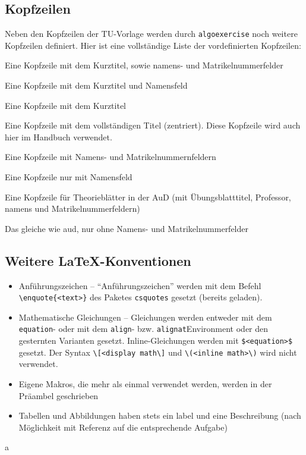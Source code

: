 \documentclass[
    titleprefix=AlgoTeX,
    inlineshortcut=java,
    corporatedesign,
    boxarc,
]{algoexercise}
\begin{document}
    \subsection{Kopfzeilen}
    Neben den Kopfzeilen der TU-Vorlage werden durch \verb+algoexercise+ noch weitere Kopfzeilen definiert.
    Hier ist eine vollständige Liste der vordefinierten Kopfzeilen:
    \begin{description}[leftmargin=3cm]
        \item[title-name-id] Eine
            Kopfzeile mit dem Kurztitel, sowie namens- und Matrikelnummerfelder
        \item[title-name] Eine Kopfzeile mit dem Kurztitel und
            Namensfeld
        \item[title] Eine Kopfzeile mit dem Kurztitel
        \item[fulltitle-centered] Eine Kopfzeile mit dem vollständigen Titel
            (zentriert).
            Diese Kopfzeile wird auch hier im Handbuch verwendet.
        \item[name-id] Eine Kopfzeile mit Namens- und Matrikelnummernfeldern
        \item[name] Eine Kopfzeile nur mit Namensfeld
        \item[aud] Eine Kopfzeile für Theorieblätter in der AuD (mit Übungsblatttitel, Professor, namens und
            Matrikelnummerfeldern)
        \item[aud-min] Das gleiche wie aud, nur ohne Namens- und Matrikelnummerfelder
    \end{description}
    \subsection{Weitere \LaTeX-Konventionen}
    \begin{itemize}
        \item Anführungszeichen -- \enquote{Anführungszeichen} werden mit dem Befehl \verb+\enquote{<text>}+ des Paketes
            \verb+csquotes+
            gesetzt (bereits geladen).
        \item Mathematische Gleichungen -- Gleichungen werden entweder mit dem \verb+equation+- oder mit dem \verb+align+- bzw.
            \verb+alignat+Environment oder den gesternten Varianten gesetzt.
            Inline-Gleichungen werden mit \verb+$<equation>$+ gesetzt.
            Der Syntax \verb+\[<display math\]+ und \verb+\(<inline math>\)+ wird nicht verwendet.
        \item Eigene Makros, die mehr als einmal verwendet werden, werden in der Präambel geschrieben
        \item Tabellen und Abbildungen haben stets ein label und eine Beschreibung (nach Möglichkeit mit Referenz auf die
            entsprechende Aufgabe)
    \end{itemize}
    \begin{vfrager}
        a
    \end{vfrager}
    \clearpage{}
\end{document}

